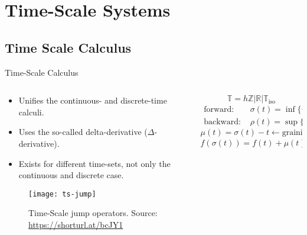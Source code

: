 
\section{Time-Scale Systems}%
\label{sec:ts-systems}

\subsection{Time Scale Calculus}%
\label{subsec:ts-calculus}

\begin{slide}{Time-Scale Calculus}
  \begin{columns}[c]
    \begin{column}{0.48\textwidth}
      \begin{itemize}
        \item Unifies the continuous- and discrete-time calculi.
        \item Uses the so-called delta-derivative (\(\Delta\)-derivative).
        \item Exists for different time-sets, not only the continuous and
              discrete case.
      \end{itemize}
      \begin{figure}[ht!]
        \centering
        \texttt{[image: ts-jump]}
        \caption{Time-Scale jump operators. Source: \url{https://shorturl.at/bcJY1}}%
      \end{figure}
    \end{column}%
    \hfill%
    \begin{column}{0.48\textwidth}
      \begin{equation}
        \mathbb{T} = h\mathbb{Z} | \mathbb{R} | \mathbb{T}_{\textrm{iso}}
      \end{equation}
      \begin{align}
        \textrm{forward:~}  & \sigma(t) = \inf\{\tau\in\mathbb{T}|\tau>t\}, \\
        \textrm{backward:~} & \rho(t) = \sup\{\tau\in\mathbb{T}|\tau<t\}.
      \end{align}
      \begin{equation}
        \mu(t) = \sigma(t)-t \leftarrow \textrm{graininess}
      \end{equation}
      \begin{equation}
        f(\sigma(t)) = f(t) + \mu(t)f^{\Delta}(t).
      \end{equation}
    \end{column}%
  \end{columns}
\end{slide}

